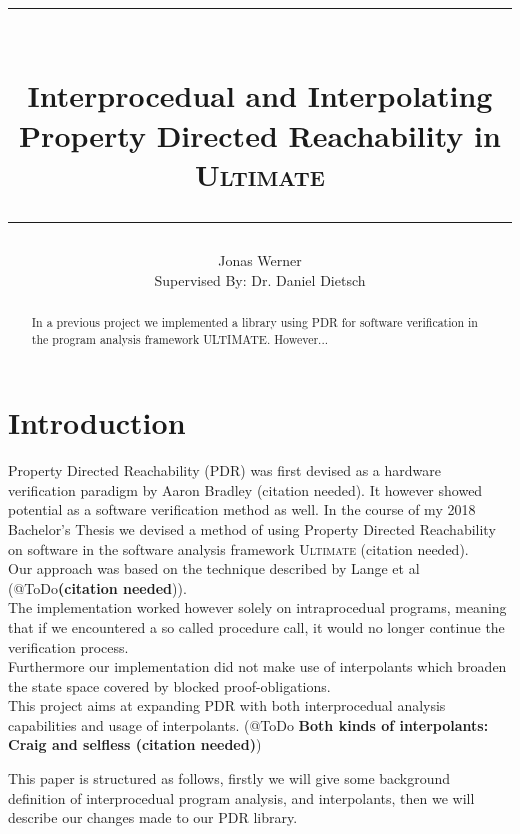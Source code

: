 \documentclass{article}
\begin{document}
	\newcommand{\HorizontalLine}{\rule{\linewidth}{0.3mm}}
	
	\title{ \HorizontalLine \\ \textbf{Interprocedual and Interpolating \\ Property Directed Reachability in \textsc{Ultimate}} \HorizontalLine}
	

	
	\author{Jonas Werner \\ Supervised By: Dr. Daniel Dietsch}


	
	\date{}
	
	\maketitle
	
	\begin{abstract}
	In a previous project we implemented a library using PDR for software verification in the program analysis framework ULTIMATE. However...
	\end{abstract}
	
	
	\section{Introduction}
	
	Property Directed Reachability (PDR) was first devised as a hardware verification paradigm by Aaron Bradley (citation needed). It however showed potential as a software verification method as well.
	In the course of my 2018 Bachelor's Thesis we devised a method of using Property Directed Reachability on software in the software analysis framework \textsc{Ultimate} (citation needed). \\
	Our approach was based on the technique described by Lange et al (@ToDo\textbf{(citation needed})). \\ The implementation worked however solely on intraprocedual programs, meaning that if we encountered a so called procedure call, it would no longer continue the verification process. \\
	Furthermore our implementation did not make use of interpolants which broaden the state space covered by blocked proof-obligations. \\
	This project aims at expanding PDR with both interprocedual analysis capabilities and usage of interpolants. (@ToDo \textbf{Both kinds of interpolants: Craig and selfless (citation needed)}) \par
    This paper is structured as follows, firstly we will give some background definition of interprocedual program analysis, and interpolants, then we will describe our changes made to our PDR library.
	
\end{document}
